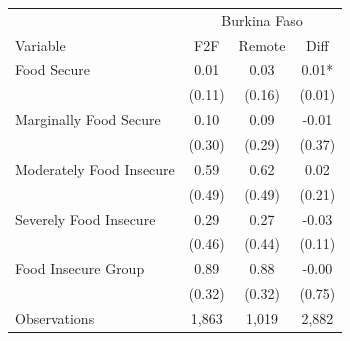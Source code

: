 \begin{tabular}{l*{3}c}
\hline\hline
 & \multicolumn{3}{c}{Burkina Faso}\\ 
Variable & F2F & Remote & Diff \\
\hline
Food Secure&0.01&0.03&0.01*\\
&(0.11)&(0.16)&(0.01)\\
Marginally Food Secure&0.10&0.09&-0.01\\
&(0.30)&(0.29)&(0.37)\\
Moderately Food Insecure&0.59&0.62&0.02\\
&(0.49)&(0.49)&(0.21)\\
Severely Food Insecure&0.29&0.27&-0.03\\
&(0.46)&(0.44)&(0.11)\\
Food Insecure Group&0.89&0.88&-0.00\\
&(0.32)&(0.32)&(0.75)\\
\hline
Observations & 1,863 & 1,019 & 2,882 \\
\hline\hline
\end{tabular}
